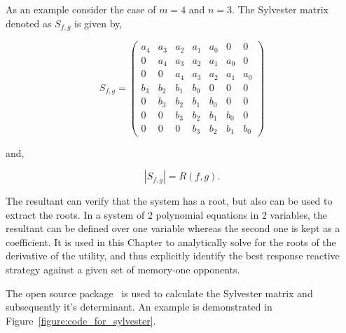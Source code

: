 As an example consider the case of \(m = 4\) and \(n = 3\). The Sylvester matrix
denoted as \(S_{f,g}\) is given by,

\begin{equation}
S_{f,g} = \begin{pmatrix} a_{4} & a_{3} & a_{2} & a_{1} & a_{0} & 0     & 0    \\
                          0     & a_{4} & a_{3} & a_{2} & a_{1} & a_{0} & 0    \\
                          0     & 0     & a_{4} & a_{3} & a_{2} & a_{1} & a_{0} \\
                          b_{3} & b_{2} & b_{1} & b_{0} &     0 & 0     & 0     \\
                          0     & b_{3} & b_{2} & b_{1} & b_{0} & 0     & 0     \\
                          0     & 0     & b_{3} & b_{2} & b_{1} & b_{0} & 0     \\
                          0     & 0     & 0     & b_{3} & b_{2} & b_{1} & b_{0}
                        \end{pmatrix}
\end{equation}

and,

\[|S_{f, g}| = R(f, g).\]

The resultant can verify that the system has a root, but also can be
used to extract the roots. In a system of 2 polynomial equations in 2
variables, the resultant can be defined over one variable whereas the second one
is kept as a coefficient. It is used in this Chapter to analytically solve for
the roots of the derivative of the utility, and thus explicitly identify the best response
reactive strategy against a given set of memory-one opponents.

The open source package~\cite{sympy} is used to calculate the Sylvester matrix
and subsequently it's determinant. An example is demonstrated in
Figure~\ref{figure:code_for_sylvester}.


